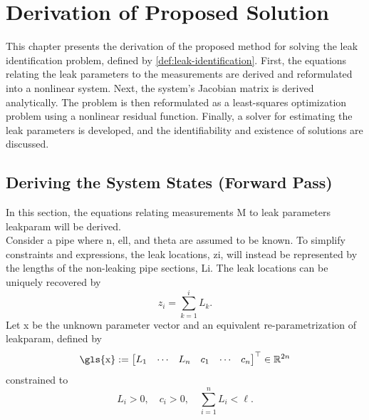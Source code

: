 \chapter{Derivation of Proposed Solution}
\label{chap:derivations}

This chapter presents the derivation of the proposed method for solving the leak identification problem, defined by \autoref{def:leak-identification}. First, the equations relating the leak parameters to the measurements are derived and reformulated into a nonlinear system. Next, the system's Jacobian matrix is derived analytically. The problem is then reformulated as a least-squares optimization problem using a nonlinear residual function. Finally, a solver for estimating the leak parameters is developed, and the identifiability and existence of solutions are discussed.

\section{Deriving the System States (Forward Pass)}

In this section, the equations relating measurements \gls{M} to leak parameters \gls{leakparam} will be derived.\\

Consider a pipe where \gls{n}, \gls{ell}, and \gls{theta} are assumed to be known. To simplify constraints and expressions, the leak locations, \gls{zi}, will instead be represented by the lengths of the non-leaking pipe sections, \gls{Li}. The leak locations can be uniquely recovered by
\begin{equation*}
    z_i=\sum_{k=1}^i L_k.
\end{equation*}
Let \gls{x} be the unknown parameter vector and an equivalent re-parametrization of \gls{leakparam}, defined by 
\begin{equation*}
    \text{\gls{x}} := \begin{bmatrix}
        L_1 & \cdots & L_n & c_1 & \cdots & c_n
    \end{bmatrix}^\top \in \mathbb{R}^{2n}
\end{equation*}
constrained to
\begin{equation}
\label{eq:constraints}
    L_i>0,\quad c_i>0, \quad \sum_{i=1}^n L_i<\ell.
\end{equation}

